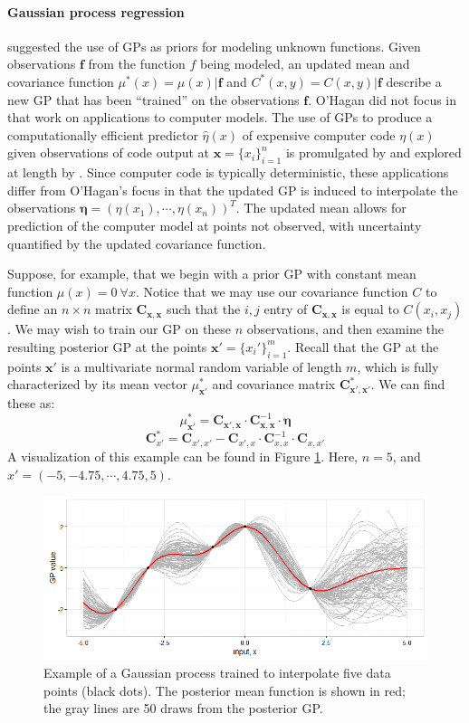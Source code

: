 \documentclass{article}
\begin{document}
\paragraph{Gaussian process regression}

\cite{OHagan1978} suggested the use of GPs as priors for modeling unknown functions. Given observations $\mathbf f$ from the function $f$ being modeled, an updated mean and covariance function $\mu^*(x)=\mu(x)|\mathbf f$ and $C^*(x,y) = C(x,y)|\mathbf f$ describe a new GP that has been ``trained'' on the observations $\mathbf f$. O'Hagan did not focus in that work on applications to computer models. The use of GPs to produce a computationally efficient predictor $\hat \eta (x)$ of expensive computer code $\eta(x)$ given observations of code output at $\mathbf x=\{x_i\}_{i=1}^n$ is promulgated by \cite{Sacks1989} and explored at length by \cite{Santner2003a}. Since computer code is typically deterministic, these applications differ from O'Hagan's focus in that the updated GP is induced to interpolate the observations $\boldsymbol \eta = (\eta(x_1),\cdots,\eta(x_n))^T$. The updated mean allows for prediction of the computer model at points not observed, with uncertainty quantified by the updated covariance function.

Suppose, for example, that we begin with a prior GP with constant mean function $\mu(x)=0\ \forall x$. Notice that we may use our covariance function $C$ to define an $n\times n$ matrix $\mathbf C_{\mathbf x,\mathbf x}$ such that the $i,j$ entry of $\mathbf C_{\mathbf x,\mathbf x}$ is equal to $C(x_i,x_j)$. We may wish to train our GP on these $n$ observations, and then examine the resulting posterior GP at the points $\mathbf x'=\{x_i' \}_{i=1}^m$. Recall that the GP at the points $\mathbf x'$ is a multivariate normal random variable of length $m$, which is fully characterized by its mean vector $\mu^*_{\mathbf x'}$ and covariance matrix $\mathbf C^*_{\mathbf x',\mathbf x'}$. We can find these as:
\[
\mu^*_{\mathbf x'}=\mathbf C_{\mathbf x',\mathbf x}\cdot \mathbf C_{\mathbf x,\mathbf x} ^{-1}\cdot \boldsymbol \eta
\]
\[
\mathbf C^*_{x'}=\mathbf C_{x',x'}-\mathbf C_{x',x}\cdot \mathbf C_{x,x}^{-1}\cdot \mathbf C_{x,x'}
\]
A visualization of this example can be found in Figure \ref{fig:gp_example}. Here, $n=5$, and $x'=(-5,-4.75,⋯,4.75,5)$. 

\begin{figure}[h]
\centering
\includegraphics[width=.75\linewidth]{gp_example}
\caption{Example of a Gaussian process trained to interpolate five data points (black dots). The posterior mean function is shown in red; the gray lines are 50 draws from the posterior GP.}
\label{fig:gp_example}
\end{figure}
\end{document}
